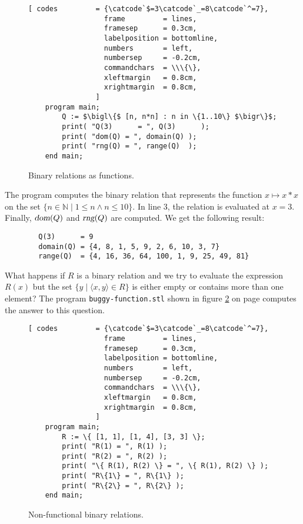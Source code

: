 \begin{figure}[!ht]
  \centering
\begin{Verbatim}[ codes         = {\catcode`$=3\catcode`_=8\catcode`^=7},
                  frame         = lines, 
                  framesep      = 0.3cm, 
                  labelposition = bottomline,
                  numbers       = left,
                  numbersep     = -0.2cm,
                  commandchars  = \\\{\},
                  xleftmargin   = 0.8cm,
                  xrightmargin  = 0.8cm,
                ]
    program main;
        Q := $\bigl\{$ [n, n*n] : n in \{1..10\} $\bigr\}$;
        print( "Q(3)      = ", Q(3)      );
        print( "dom(Q) = ", domain(Q) );
        print( "rng(Q) = ", range(Q)  );
    end main;
\end{Verbatim} 
\vspace*{-0.3cm}
\caption{Binary relations as functions.}  \label{fig:function.stl}
\end{figure} %

\noindent
The program computes the binary relation that represents the function 
 $x \mapsto x*x$ on the set $\{n\in \mathbb{N} \mid 1 \leq n \wedge n \leq 10 \}$.  In
 line 3, the relation is evaluated at $x=3$.  Finally, 
$\textsl{dom}(Q)$ and $\textsl{rng}(Q)$ are computed.
We get the following result:
\begin{verbatim}
        Q(3)      = 9
        domain(Q) = {4, 8, 1, 5, 9, 2, 6, 10, 3, 7}
        range(Q)  = {4, 16, 36, 64, 100, 1, 9, 25, 49, 81}
\end{verbatim}
What happens if $R$ is a binary relation and we try to evaluate the expression 
$R(x)$ but  the set $\{ y \mid \langle x, y \rangle \in R \}$ is either empty or contains
more than one element?
The program \texttt{buggy-function.stl} shown in figure \ref{fig:buggy-function.stl} on page
\pageref{fig:buggy-function.stl} computes the answer to this question.

\begin{figure}[!ht]
  \centering
\begin{Verbatim}[ codes         = {\catcode`$=3\catcode`_=8\catcode`^=7},
                  frame         = lines, 
                  framesep      = 0.3cm, 
                  labelposition = bottomline,
                  numbers       = left,
                  numbersep     = -0.2cm,
                  commandchars  = \\\{\},
                  xleftmargin   = 0.8cm,
                  xrightmargin  = 0.8cm,
                ]
    program main;
        R := \{ [1, 1], [1, 4], [3, 3] \};
        print( "R(1) = ", R(1) );
        print( "R(2) = ", R(2) );
        print( "\{ R(1), R(2) \} = ", \{ R(1), R(2) \} );
        print( "R\{1\} = ", R\{1\} );
        print( "R\{2\} = ", R\{2\} );
    end main;
\end{Verbatim} 
\vspace*{-0.3cm}
\caption{Non-functional binary relations.}  \label{fig:buggy-function.stl}
\end{figure} %

